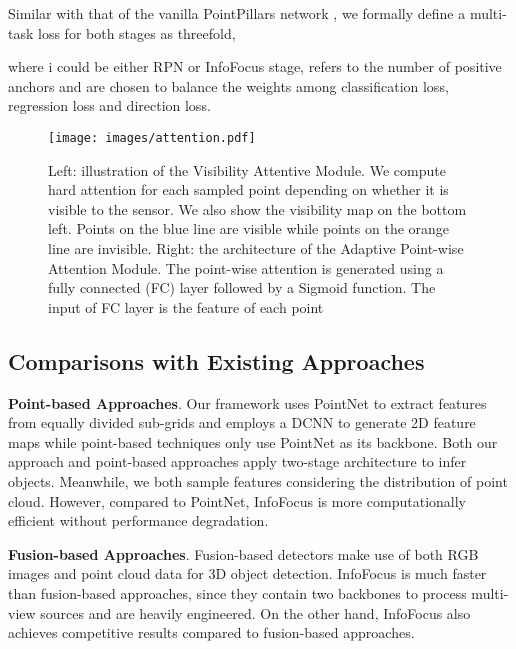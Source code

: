 \documentclass[runningheads]{llncs}
\begin{document}
Similar with that of the vanilla PointPillars network \cite{lang2019PointPillars}, we formally define a multi-task loss for both stages as threefold, 



where i could be either RPN or InfoFocus stage,  refers to the number of positive anchors and  are chosen to balance the weights among classification loss, regression loss and direction loss. 

\begin{figure}[t]
\centering
  \texttt{[image: images/attention.pdf]}
  \\
  \caption{Left: illustration of the Visibility Attentive Module. We compute hard attention for each sampled point depending on whether it is visible to the sensor. We also show the visibility map on the bottom left. Points on the blue line are visible while points on the orange line are invisible. Right: the architecture of the Adaptive Point-wise Attention Module. The point-wise attention is generated using a fully connected (FC) layer followed by a Sigmoid function. The input of FC layer is the feature of each point}
\label{fig:visibility}
\end{figure}

\subsection{Comparisons with Existing Approaches}
\noindent\textbf{Point-based Approaches}. Our framework uses PointNet to extract features from equally divided sub-grids and employs a DCNN to generate 2D feature maps while point-based techniques \cite{qi2018frustum,wang2019frustum,Lan_2019_CVPR,shi2019pointrcnn} only use PointNet as its backbone. Both our approach and point-based approaches apply two-stage architecture to infer objects. Meanwhile, we both sample features considering the distribution of point cloud. However, compared to PointNet, InfoFocus is more computationally efficient without performance degradation.

\noindent\textbf{Fusion-based Approaches}. Fusion-based detectors \cite{chen2019fast,liu2019point} make use of both RGB images and point cloud data for 3D object detection. InfoFocus is much faster than fusion-based approaches, since they contain two backbones to process multi-view sources and are heavily engineered. On the other hand, InfoFocus also achieves competitive results compared to fusion-based approaches. 
\end{document}

